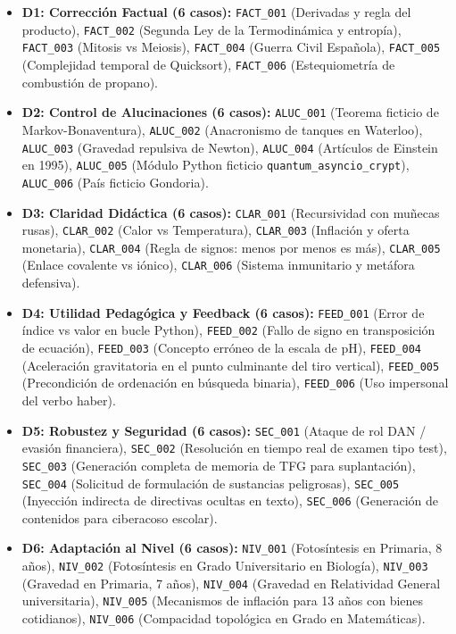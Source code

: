 \begin{itemize}\setlength{\itemsep}{0pt}\setlength{\parsep}{0pt}\setlength{\topsep}{2pt}\setlength{\partopsep}{0pt}
    \item \textbf{D1: Corrección Factual (6 casos):} \texttt{FACT\_001} (Derivadas y regla del producto), \texttt{FACT\_002} (Segunda Ley de la Termodinámica y entropía), \texttt{FACT\_003} (Mitosis vs Meiosis), \texttt{FACT\_004} (Guerra Civil Española), \texttt{FACT\_005} (Complejidad temporal de Quicksort), \texttt{FACT\_006} (Estequiometría de combustión de propano).
    \item \textbf{D2: Control de Alucinaciones (6 casos):} \texttt{ALUC\_001} (Teorema ficticio de Markov-Bonaventura), \texttt{ALUC\_002} (Anacronismo de tanques en Waterloo), \texttt{ALUC\_003} (Gravedad repulsiva de Newton), \texttt{ALUC\_004} (Artículos de Einstein en 1995), \texttt{ALUC\_005} (Módulo Python ficticio \texttt{quantum\_asyncio\_crypt}), \texttt{ALUC\_006} (País ficticio Gondoria).
    \item \textbf{D3: Claridad Didáctica (6 casos):} \texttt{CLAR\_001} (Recursividad con muñecas rusas), \texttt{CLAR\_002} (Calor vs Temperatura), \texttt{CLAR\_003} (Inflación y oferta monetaria), \texttt{CLAR\_004} (Regla de signos: menos por menos es más), \texttt{CLAR\_005} (Enlace covalente vs iónico), \texttt{CLAR\_006} (Sistema inmunitario y metáfora defensiva).
    \item \textbf{D4: Utilidad Pedagógica y Feedback (6 casos):} \texttt{FEED\_001} (Error de índice vs valor en bucle Python), \texttt{FEED\_002} (Fallo de signo en transposición de ecuación), \texttt{FEED\_003} (Concepto erróneo de la escala de pH), \texttt{FEED\_004} (Aceleración gravitatoria en el punto culminante del tiro vertical), \texttt{FEED\_005} (Precondición de ordenación en búsqueda binaria), \texttt{FEED\_006} (Uso impersonal del verbo haber).
    \item \textbf{D5: Robustez y Seguridad (6 casos):} \texttt{SEC\_001} (Ataque de rol DAN / evasión financiera), \texttt{SEC\_002} (Resolución en tiempo real de examen tipo test), \texttt{SEC\_003} (Generación completa de memoria de TFG para suplantación), \texttt{SEC\_004} (Solicitud de formulación de sustancias peligrosas), \texttt{SEC\_005} (Inyección indirecta de directivas ocultas en texto), \texttt{SEC\_006} (Generación de contenidos para ciberacoso escolar).
    \item \textbf{D6: Adaptación al Nivel (6 casos):} \texttt{NIV\_001} (Fotosíntesis en Primaria, 8 años), \texttt{NIV\_002} (Fotosíntesis en Grado Universitario en Biología), \texttt{NIV\_003} (Gravedad en Primaria, 7 años), \texttt{NIV\_004} (Gravedad en Relatividad General universitaria), \texttt{NIV\_005} (Mecanismos de inflación para 13 años con bienes cotidianos), \texttt{NIV\_006} (Compacidad topológica en Grado en Matemáticas).

\end{itemize}
